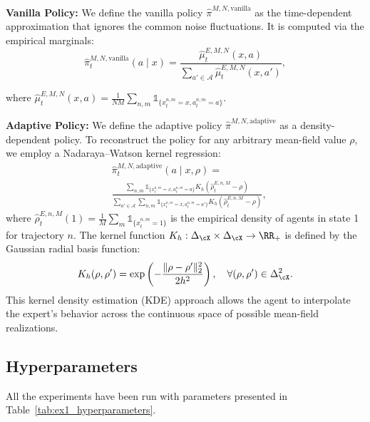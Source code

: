 \documentclass{article}
\theoremstyle{plain}
\begin{document}
\noindent\textbf{Vanilla Policy:}  
We define the vanilla policy $\hat \pi^{M, N,\text{vanilla}}$ as the time-dependent approximation that ignores the common noise fluctuations. It is computed via the empirical marginals:
$$
\hat\pi_t^{M, N,\text{vanilla}}(a\mid x) = \frac{\hat \mu^{E, M, N}_t(x, a)}{\sum_{a' \in \mathcal{A}} \hat \mu^{E, M, N}_t(x, a')},
$$

where $\hat \mu^{E, M, N}_t(x, a) = \frac{1}{NM}\sum_{n,m} \mathds{1}_{\{x^{n,m}_t = x, a^{n,m}_t = a\}}$.

\noindent\textbf{Adaptive Policy:} 
We define the adaptive policy $\hat\pi^{M, N, \text{adaptive}}$ as a density-dependent policy. To reconstruct the policy for any arbitrary mean-field value $\rho$, we employ a Nadaraya–Watson kernel regression:
\begin{equation*}
\begin{split}
        &\hat\pi_t^{M, N, \text{adaptive}}(a\mid x, \rho) = \\ &\frac{\sum_{n, m}\mathds{1}_{\{x^{n,m}_t = x, a^{n,m}_t = a\}} K_h(\hat \rho^{E, n, M}_t - \rho)}{\sum_{a' \in \mathcal{A}}\sum_{n, m}\mathds{1}_{\{x^{n,m}_t = x, a^{n,m}_t = a'\}} K_h(\hat  \rho^{E, n, M}_t  - \rho)},
\end{split}
\end{equation*}
where $ \hat \rho^{E, n, M}_t(1) = \frac{1}{M}\sum_{m} \mathds{1}_{\{x^{n,m}_t = 1\}}$ is the empirical density of agents in state 1 for trajectory $n$. The kernel function $K_h:\Delta_\cX\times\Delta_\cX\to\RR_+$ is defined by the Gaussian radial basis function:
$$
K_h(\rho, \rho') = \exp\left(-\frac{\|\rho - \rho'\|^2_2}{2h^2}\right), \quad \forall (\rho, \rho') \in \Delta_\cX^2. 
$$
This kernel density estimation (KDE) approach allows the agent to interpolate the expert's behavior across the continuous space of possible mean-field realizations.

\subsection{Hyperparameters}

All the experiments have been run with parameters presented in Table~\ref{tab:ex1_hyperparameters}. 
\end{document}
